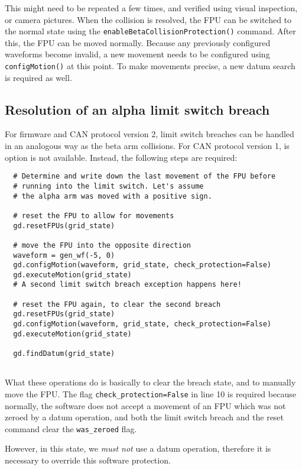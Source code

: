 \documentclass{scrartcl}[12pt,a4paper]
\begin{document}
This might need to be repeated a few times, and verified using visual
inspection, or camera pictures. When the collision is resolved, the
FPU can be switched to the normal state using the
\texttt{enableBetaCollisionProtection()} command.  After this, the FPU
can be moved normally. Because any previously configured waveforms
become invalid, a new movement needs to be configured using
\texttt{configMotion()} at this point. To make movements precise, a
new datum search is required as well.

\subsection{Resolution of an alpha limit switch breach}

For firmware and CAN protocol  version 2, limit switch
breaches can be handled in an analogous way as the
beta arm collisions. For CAN protocol version 1,
is option is not available. Instead, the following
steps are required:

\begin{verbatim}
  # Determine and write down the last movement of the FPU before
  # running into the limit switch. Let's assume
  # the alpha arm was moved with a positive sign.

  # reset the FPU to allow for movements
  gd.resetFPUs(grid_state)

  # move the FPU into the opposite direction
  waveform = gen_wf(-5, 0)
  gd.configMotion(waveform, grid_state, check_protection=False)
  gd.executeMotion(grid_state)
  # A second limit switch breach exception happens here!

  # reset the FPU again, to clear the second breach
  gd.resetFPUs(grid_state)
  gd.configMotion(waveform, grid_state, check_protection=False)
  gd.executeMotion(grid_state)

  gd.findDatum(grid_state)
  
\end{verbatim}
  

What these operations do is basically to clear the breach state, and
to manually move the FPU.  The flag \texttt{check\_protection=False}
in line 10 is required because normally, the software does not accept
a movement of an FPU which was not zeroed by a datum operation,
and both the limit switch breach and the reset command clear the
\texttt{was\_zeroed} flag.

However, in this state, we \emph{must not} use a datum operation,
therefore it is necessary to override this software protection.
\end{document}
